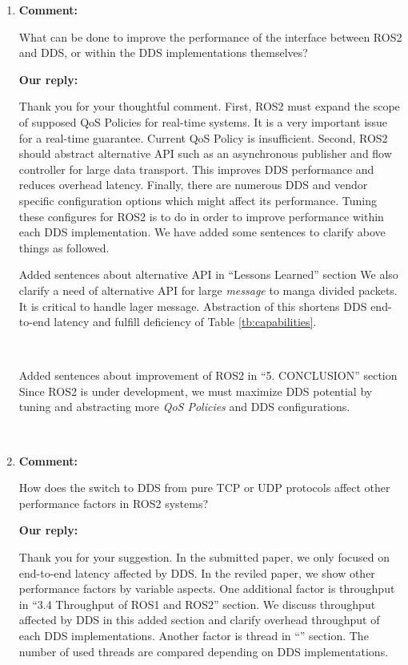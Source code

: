 \documentclass{article}
\begin{document}
\begin{enumerate}
\item \begin{flushleft}
    \textbf{Comment:}
  \end{flushleft}
  What can be done to improve the performance of the interface between ROS2 and DDS, or within the DDS implementations themselves?

  \begin{flushleft}
    \textbf{Our reply:}
  \end{flushleft}
  Thank you for your thoughtful comment.
  First, ROS2 must expand the scope of supposed QoS Policies for real-time systems.
  It is a very important issue for a real-time guarantee.
  Current QoS Policy is insufficient.
  Second, ROS2 should abstract alternative API such as an asynchronous publisher and flow controller for large data transport.
  This improves DDS performance and reduces overhead latency.
  Finally, there are numerous DDS and vendor specific configuration options which might affect its performance.
  Tuning these configures for ROS2 is to do in order to improve performance within each DDS implementation.
  We have added some sentences to clarify above things as followed.
  \begin{itembox}[|]{Added sentences about alternative API in ``Lessons Learned'' section}
    We also clarify a need of alternative API for large \emph{message} to manga divided packets.
    It is critical to handle lager message.
    Abstraction of this shortens DDS end-to-end latency and fulfill deficiency of Table \ref{tb:capabilities}.
  \end{itembox}\\
  \begin{itembox}[|]{Added sentences about improvement of ROS2 in ``5. CONCLUSION'' section}
    Since ROS2 is under development, we must maximize DDS potential by tuning and abstracting more \emph{QoS Policies} and DDS configurations.
  \end{itembox}\\

\item \begin{flushleft}
    \textbf{Comment:}
  \end{flushleft}
  How does the switch to DDS from pure TCP or UDP protocols affect other performance factors in ROS2 systems? 

  \begin{flushleft}
    \textbf{Our reply:}
  \end{flushleft}
  Thank you for your suggestion.
  In the submitted paper, we only focused on end-to-end latency affected by DDS.
  In the reviled paper, we show other performance factors by variable aspects.
  One additional factor is throughput in ``3.4 Throughput of ROS1 and ROS2'' section.
  We discuss throughput affected by DDS in this added section and clarify overhead throughput of each DDS implementations.
  Another factor is thread in ``'' section.
  The number of used threads are compared depending on DDS implementations.

\end{enumerate}
\end{document}
